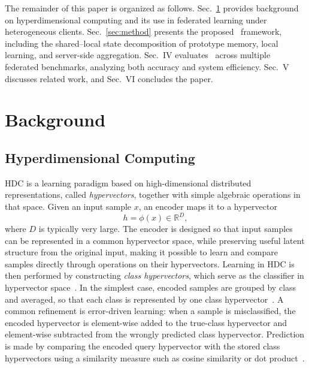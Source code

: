\documentclass[lettersize,journal]{IEEEtran}
\newcommand{\rev}[1]{#1}
\begin{document}
The remainder of this paper is organized as follows.
Sec.~\ref{sec:background} provides background on hyperdimensional computing and its use in federated learning under heterogeneous clients.
Sec.~\ref{sec:method} presents the proposed \Design\ framework, including the \rev{shared--local state decomposition of prototype memory}, local learning, and server-side aggregation.
Sec.~IV evaluates \Design\ across multiple federated benchmarks, analyzing both accuracy and system efficiency.
Sec.~V discusses related work, and Sec.~VI concludes the paper.

\section{Background}
\label{sec:background}

\subsection{Hyperdimensional Computing}

HDC is a learning paradigm based on high-dimensional distributed representations, called \emph{hypervectors}, together with simple algebraic operations in that space.
Given an input sample $x$, an encoder maps it to a hypervector
\begin{equation}
\label{eq:hdc_encoder}
h = \phi(x) \in \mathbb{R}^{D},
\end{equation}
where $D$ is typically very large. 
The encoder is designed so that input samples can be represented in a common hypervector space, while preserving useful latent structure from the original input, making it possible to learn and compare samples directly through operations on their hypervectors.
Learning in HDC is then performed by constructing \emph{class hypervectors}, which serve as the classifier in hypervector space~\cite{rahimi2017hdc,stock2024hdc}.
In the simplest case, encoded samples are grouped by class and averaged, so that each class is represented by one class hypervector~\cite{lee2024efficient, yu2023understandinghyperdimensionalcomputingparallel}.
A common refinement is error-driven learning: when a sample is misclassified, the encoded hypervector is element-wise added to the true-class hypervector and element-wise subtracted from the wrongly predicted class hypervector.
Prediction is made by comparing the encoded query hypervector with the stored class hypervectors using a similarity measure such as cosine similarity or dot product~\cite{rahimi2016robust}.
\end{document}
